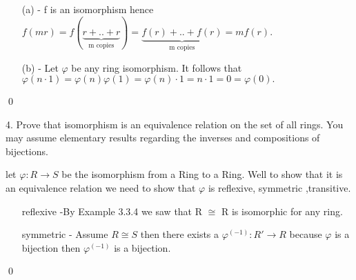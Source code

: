 \documentclass[11pt]{article}
\newcommand{\vp}{\varphi}
\begin{document}
\proof
{
\begin{itemize}
    \item[(a)]- f is an isomorphism hence \(f(mr)= f(\underbrace{r+..+r}_\text{m copies}) = \underbrace{f(r)+..+f(r)}_\text{m copies} = mf(r).\)
    \item[(b)]- Let \(\vp\) be any ring isomorphism. It follows that \(\vp(n\cdot1) = \vp(n)\vp(1) = \vp(n)\cdot1 = n \cdot 1 = 0 = \vp(0).\)
\end{itemize}
}

\qed

\exercise
{
4. Prove that isomorphism is an equivalence relation on the set of all rings.  You may assume elementary results regarding the inverses and compositions of bijections.
}

\proof
{ let \(\vp:R\rightarrow S \) be the isomorphism from a Ring to a Ring. 
Well to show that it is an equivalence relation we need to show that \(\vp\) is reflexive, symmetric ,transitive.

\begin{itemize}
    \item[reflexive]-By Example 3.3.4 we saw that R \(\cong\) R is isomorphic for any ring.
    \item[symmetric]- Assume \(R\cong S \) then there exists a \(\vp^(-1):R\prime \rightarrow R\) because \(\vp\) is a bijection then \(\vp^(-1)\) is a bijection.  \ 
\end{itemize}

}
\qed
\end{document}
